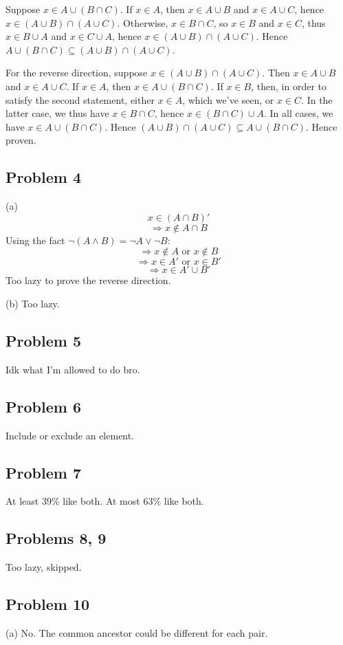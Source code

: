 \documentclass{book}
\begin{document}
Suppose $x \in A \cup (B \cap C)$. If $x \in A$, then $x \in A \cup B$ and $x \in A \cup C$, hence $x \in (A \cup B) \cap (A \cup C)$. Otherwise, $x \in B \cap C$, so $x \in B$ and $x \in C$, thus $x \in B \cup A$ and $x \in C \cup A$, hence $x \in (A \cup B) \cap (A \cup C)$. Hence $A \cup (B \cap C) \subseteq (A \cup B) \cap (A \cup C)$.

For the reverse direction, suppose $x \in (A \cup B) \cap (A \cup C)$. Then $x \in A \cup B$ and $x \in A \cup C$. If $x \in A$, then $x \in A \cup (B \cap C)$. If $x \in B$, then, in order to satisfy the second statement, either $x \in A$, which we've seen, or $x \in C$. In the latter case, we thus have $x \in B \cap C$, hence $x \in (B \cap C) \cup A$. In all cases, we have $x \in A \cup (B \cap C)$. Hence $(A \cup B) \cap (A \cup C) \subseteq A \cup (B \cap C)$. Hence proven.

\subsection*{Problem 4}
(a)
$$x \in (A \cap B)'$$
$$\Rightarrow x \not \in A \cap B$$
Using the fact $\neg(A \land B) = \neg A \lor \neg B$:
$$\Rightarrow x \not \in A \text{ or } x \not \in B$$
$$\Rightarrow x \in A' \text{ or } x \in B'$$
$$\Rightarrow x \in A' \cup B'$$
Too lazy to prove the reverse direction.

\noindent
(b)
Too lazy.

\subsection*{Problem 5}
Idk what I'm allowed to do bro.

\subsection*{Problem 6}
Include or exclude an element.

\subsection*{Problem 7}
At least $39\%$ like both. At most $63\%$ like both.

\subsection*{Problems 8, 9}
Too lazy, skipped.

\subsection*{Problem 10}
(a)
No. The common ancestor could be different for each pair.
\end{document}
